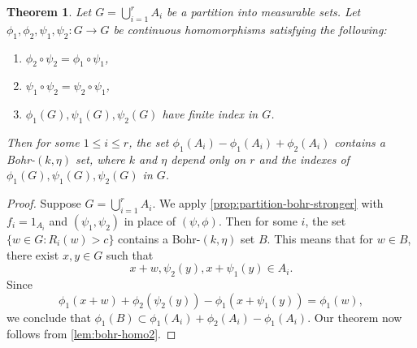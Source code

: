 \documentclass[10pt]{article}
\newtheorem{theorem}{Theorem}[section]
\theoremstyle{definition}
\begin{document}
\begin{theorem}\label{th:main-partition-true}
Let $G=\bigcup_{i=1}^r A_i$ be a partition into measurable sets. Let $\phi_1, \phi_2, \psi_1, \psi_2: G \rightarrow G$ be continuous homomorphisms satisfying the following:
\begin{enumerate}
\item $\phi_2 \circ \psi_2 = \phi_1 \circ \psi_1$,
\item $\psi_1 \circ \psi_2 = \psi_2 \circ \psi_1$,
\item $\phi_1(G), \psi_1(G), \psi_2(G)$ have finite index in $G$.
\end{enumerate}
Then for some $1 \leq i \leq r$, the set $\phi_1(A_i) - \phi_1(A_i) + \phi_2(A_i)$ contains a Bohr-$(k, \eta)$ set, where $k$ and $\eta$ depend only on $r$ and the indexes of $\phi_1(G), \psi_1(G), \psi_2(G)$ in $G$.
\end{theorem}

\begin{proof}
Suppose $G = \bigcup_{i=1}^r A_i$. We apply \cref{prop:partition-bohr-stronger} with $f_i = 1_{A_i}$ and $(\psi_1, \psi_2)$ in place of $(\psi, \phi)$. Then for some $i$, the set $\{ w \in G: R_i(w) > c\}$ contains a Bohr-$(k,\eta)$ set $B$. This means that for $w \in B$, there exist $x, y \in G$ such that
\[
x+w, \psi_2(y), x + \psi_1(y) \in A_i.
\]
Since
\[
\phi_1(x+w) + \phi_2( \psi_2(y)) - \phi_1( x + \psi_1(y)) = \phi_1(w),
\]
we conclude that $\phi_1(B) \subset \phi_1(A_i) + \phi_2(A_i) - \phi_1(A_i)$. Our theorem now follows from \cref{lem:bohr-homo2}.
\end{proof}
\end{document}
